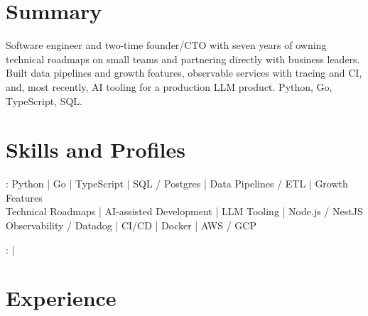 \documentclass[print]{jack-resume}
\begin{document}
\pagecolor{darkmodeBackground}


\begin{minipage}[t][1cm][t]{.03\textwidth}
    \hfill
\end{minipage}

\section{Summary}
Software engineer and two-time founder/CTO with seven years of owning technical roadmaps on small teams and partnering directly with business leaders. Built data pipelines and growth features, observable services with tracing and CI, and, most recently, AI tooling for a production LLM product. Python, Go, TypeScript, SQL.
\sectionsep

\section{Skills and Profiles}
:
Python \hfill | \hfill
Go \hfill | \hfill
TypeScript \hfill | \hfill
SQL / Postgres \hfill | \hfill
Data Pipelines / ETL \hfill | \hfill
Growth Features \\
\hspace{1.0cm} Technical Roadmaps \hfill | \hfill
AI-assisted Development \hfill | \hfill
LLM Tooling \hfill | \hfill
Node.js / NestJS \\
\hspace{1.0cm} Observability / Datadog \hfill | \hfill
CI/CD \hfill | \hfill
Docker \hfill | \hfill
AWS / GCP \\

\raggedright{
    :
      \href{https://www.linkedin.com/in/jack-sturtevant/}{ \ExternalLink} |
     \href{https://github.com/jacksturt}{ \ExternalLink}}

\section{Experience}
\end{document}
